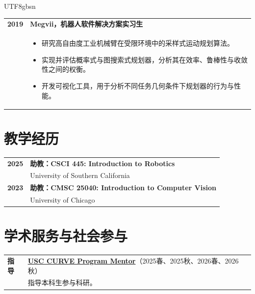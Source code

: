 \documentclass[12pt, letterpaper]{article}
\newlength{\datecolwidth}
\begin{document}
\begin{CJK*}{UTF8}{gbsn}
\begin{tabularx}{\textwidth}{@{}p{\datecolwidth} X@{}}
    \textbf{2019} & \textbf{Megvii，机器人软件解决方案实习生} \\
    & \begin{itemize}[leftmargin=*, nosep, after=\vspace{4pt}]
        \item 研究高自由度工业机械臂在受限环境中的采样式运动规划算法。
        \item 实现并评估概率式与图搜索式规划器，分析其在效率、鲁棒性与收敛性之间的权衡。
        \item 开发可视化工具，用于分析不同任务几何条件下规划器的行为与性能。
    \end{itemize}
\end{tabularx}

\section*{教学经历}

\noindent
\begin{tabularx}{\textwidth}{@{}p{\datecolwidth} X@{}}
    \textbf{2025} & \textbf{助教：CSCI 445: Introduction to Robotics} \\
    & University of Southern California \\ [4pt]

    \textbf{2023} & \textbf{助教：CMSC 25040: Introduction to Computer Vision} \\
    & University of Chicago \\
\end{tabularx}

\section*{学术服务与社会参与}

\noindent
\begin{tabularx}{\textwidth}{@{}p{\datecolwidth} X@{}}
    \textbf{指导} & \textbf{\href{https://viterbiundergrad.usc.edu/research/curve/}{USC CURVE Program Mentor}}（2025春、2025秋、2026春、2026秋） \\
    & 指导本科生参与科研。 \\[4pt]
    

\end{tabularx}
\end{CJK*}
\end{document}
